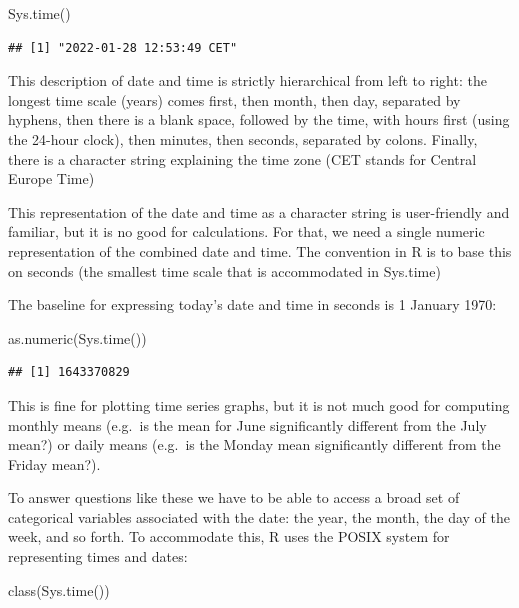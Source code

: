 \documentclass[
]{book}
\newenvironment{Shaded}{\begin{snugshade}}{\end{snugshade}}
\newcommand{\FunctionTok}[1]{\textcolor[rgb]{0.00,0.00,0.00}{#1}}
\newcommand{\NormalTok}[1]{#1}
\theoremstyle{definition}
\theoremstyle{definition}
\theoremstyle{definition}
\theoremstyle{definition}
\theoremstyle{remark}
\begin{document}
\begin{Shaded}
\begin{Highlighting}[]
\FunctionTok{Sys.time}\NormalTok{()}
\end{Highlighting}
\end{Shaded}

\begin{verbatim}
## [1] "2022-01-28 12:53:49 CET"
\end{verbatim}

This description of date and time is strictly hierarchical from left to right: the longest time scale (years) comes first, then month, then day, separated by hyphens, then there is a blank space, followed by the time, with hours first (using the 24-hour clock), then minutes, then seconds, separated by colons. Finally, there is a character string explaining the time zone (CET stands for Central Europe Time)

This representation of the date and time as a character string is user-friendly and familiar, but it is no good for calculations. For that, we need a single numeric representation of the combined date and time. The convention in R is to base this on seconds (the smallest time scale that is accommodated in Sys.time)

The baseline for expressing today's date and time in seconds is 1 January 1970:

\begin{Shaded}
\begin{Highlighting}[]
\FunctionTok{as.numeric}\NormalTok{(}\FunctionTok{Sys.time}\NormalTok{())}
\end{Highlighting}
\end{Shaded}

\begin{verbatim}
## [1] 1643370829
\end{verbatim}

This is fine for plotting time series graphs, but it is not much good for computing monthly means (e.g.~is the mean for June significantly different from the July mean?) or daily means (e.g.~is the Monday mean significantly different from the Friday mean?).

To answer questions like these we have to be able to access a broad set of categorical variables associated with the date: the year, the month, the day of the week, and so forth. To accommodate this, R uses the POSIX system for representing times and dates:

\begin{Shaded}
\begin{Highlighting}[]
\FunctionTok{class}\NormalTok{(}\FunctionTok{Sys.time}\NormalTok{())}
\end{Highlighting}
\end{Shaded}
\end{document}
